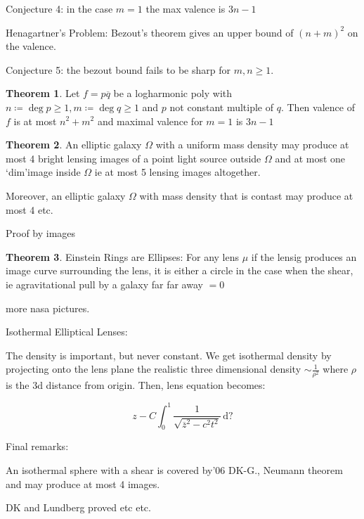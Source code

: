 \documentclass{article}
\theoremstyle{definition}
\newtheorem{theorem}{Theorem}
\begin{document}
Conjecture 4: in the case \(m=1\) the max valence is \(3n-1\) 

Henagartner's Problem: Bezout's theorem gives an upper bound of \((n+m)^2\) on the valence.

Conjecture 5: the bezout bound fails to be sharp for \(m,n \geq 1\).

\begin{theorem}
    Let \(f = p \overline{q} \) be a logharmonic poly with \(n \coloneqq \deg p \geq 1, m \coloneqq \deg q \geq 1\) and \(p\) not constant multiple of \(q\). Then valence of \(f\) is at most \(n^2 + m^2\) and maximal valence for \(m=1\) is \(3n-1\)
\end{theorem}

\begin{theorem}
    An elliptic galaxy \(\Omega\) with a uniform mass density may produce at most 4 bright lensing images of a point light source outside \(\Omega \) and at most one `dim'image inside \(\Omega\) ie at most 5 lensing images altogether.

    Moreover, an elliptic galaxy \(\Omega \) with mass density that is contast may produce at most 4 etc.

    Proof by images
\end{theorem}

\begin{theorem}
    Einstein Rings are Ellipses: For any lens \(\mu\) if the lensig produces an image curve surrounding the lens, it is either a circle in the case when the shear, ie agravitational pull by a galaxy far far away \(= 0\) 
    
    more nasa pictures.
\end{theorem}

Isothermal Elliptical Lenses:

The density is important, but never constant. We get isothermal density by projecting onto the lens plane the realistic three dimensional density \(\sim\frac{1}{\rho^2}\) where \(\rho \) is the 3d distance from origin. Then, lens equation becomes:

\[
    z - C \int_{0}^{1} \frac{1}{\sqrt{\overline{z} ^2 - c^2 t^2} } \,\mathrm{d}?
\]

Final remarks:

An isothermal sphere with a shear is covered by'06 DK-G., Neumann theorem and may produce at most 4 images.

DK and Lundberg proved etc etc.
\end{document}
